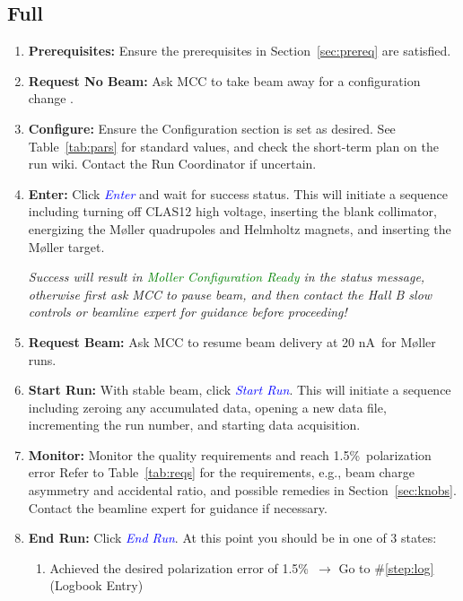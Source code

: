\documentclass[amsmath,amssymb,notitlepage,12pt]{revtex4}
\newcommand{\ibeam}{20 nA\ }
\newcommand{\easy}{1.5\%}
\begin{document}
\subsection{Full}\label{sec:proc}

\begin{enumerate}\singlespacing
    \item {\bf Prerequisites:}  Ensure the prerequisites in Section~\ref{sec:prereq} are satisfied.
    \item {\bf Request No Beam:}  Ask MCC to take beam away for a configuration change \label{step:config}.
    \item {\bf Configure:}  Ensure the Configuration section is set as desired.
        See Table~\ref{tab:pars} for standard values, and check the short-term plan on the run wiki.  Contact the Run Coordinator if uncertain.
    \item {\bf Enter:} Click \textcolor{blue}{\em Enter} and wait for success status.
        This will initiate a sequence including turning off CLAS12 high voltage, inserting the blank collimator, energizing the M{\o}ller quadrupoles and Helmholtz magnets, and inserting the M{\o}ller target.
        \begin{adjustwidth}{1cm}{1cm}
            {\em Success will result in \textcolor{green}{\em Moller Configuration Ready} in the status message, otherwise first ask MCC to pause beam, and then contact the Hall B slow controls or beamline expert for guidance before proceeding!}
        \end{adjustwidth}
    \item {\bf Request Beam:} Ask MCC to resume beam delivery at \ibeam for M{\o}ller runs.
    \item {\bf Start Run:} With stable beam, click \textcolor{blue}{\em Start Run}\label{step:start}.
        This will initiate a sequence including zeroing any accumulated data, opening a new data file, incrementing the run number, and starting data acquisition.
    \item {\bf Monitor:} Monitor the quality requirements and reach \easy\ polarization error
        Refer to Table~\ref{tab:reqs} for the requirements, e.g., beam charge asymmetry and accidental ratio, and possible remedies in Section~\ref{sec:knobs}.
        Contact the beamline expert for guidance if necessary.  
    \item {\bf End Run:} Click \textcolor{blue}{\em End Run}.  At this point you should be in one of 3 states:
        \begin{enumerate}
            \item Achieved the desired polarization error of \easy\ $\to$ Go to \#\ref{step:log} (Logbook Entry)

\end{enumerate}
\end{enumerate}
\end{document}
